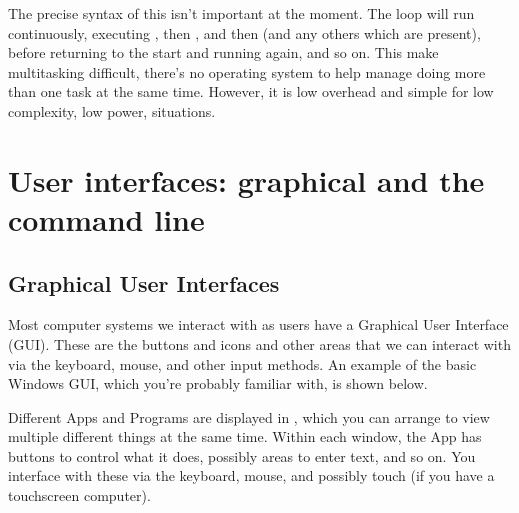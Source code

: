 \documentclass[letterpaper,10pt,british]{sphinxmanual}
\let\sphinxpxdimen\pdfpxdimen\else\newdimen\sphinxpxdimen
\begin{document}
\sphinxAtStartPar
The precise syntax of this isn’t important at the moment. The  loop will run continuously, executing , then , and then  (and any others which are present), before returning to the start and running  again, and so on. This make multi\sphinxhyphen{}tasking difficult, there’s no operating system to help manage doing more than one task at the same time. However, it is low overhead and simple for low complexity, low power, situations.

\sphinxstepscope


\section{User interfaces: graphical and the command line}
\label{\detokenize{chapters/computer_software/gui_and_cli:user-interfaces-graphical-and-the-command-line}}\label{\detokenize{chapters/computer_software/gui_and_cli:cli}}\label{\detokenize{chapters/computer_software/gui_and_cli::doc}}

\subsection{Graphical User Interfaces}
\label{\detokenize{chapters/computer_software/gui_and_cli:graphical-user-interfaces}}
\sphinxAtStartPar
Most computer systems we interact with as users have a Graphical User Interface (GUI). These are the buttons and icons and other areas that we can interact with via the keyboard, mouse, and other input methods. An example of the basic Windows GUI, which you’re probably familiar with, is shown below.

\begin{figure}[htbp]
\centering

\noindent\sphinxincludegraphics[width=800\sphinxpxdimen]{{desktop}.png}
\end{figure}

\sphinxAtStartPar
Different Apps and Programs are displayed in , which you can arrange to view multiple different things at the same time. Within each window, the App has buttons to control what it does, possibly areas to enter text, and so on. You interface with these via the keyboard, mouse, and possibly touch (if you have a touchscreen computer).
\end{document}
